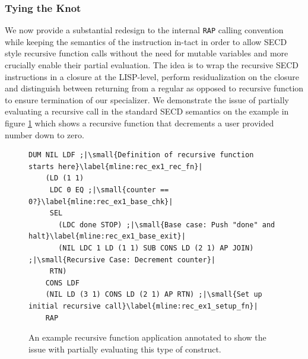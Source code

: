 \documentclass[a4paper,12pt,twoside,openright]{report}
\theoremstyle{definition}
\begin{document}


\subsubsection{Tying the Knot}\label{ssubsec:knot}
We now provide a substantial redesign to the internal \texttt{RAP} calling convention while keeping the semantics of the instruction in-tact in order to allow SECD style recursive function calls without the need for mutable variables and more crucially enable their partial evaluation. The idea is to wrap the recursive SECD instructions in a closure at the LISP-level, perform residualization on the closure and distinguish between returning from a regular as opposed to recursive function to ensure termination of our specializer. We demonstrate the issue of partially evaluating a recursive call in the standard SECD semantics on the example in figure \ref{lst:secd_recursion_ex1} which shows a recursive function that decrements a user provided number down to zero.

\begin{figure}[ht]
\begin{verbatim}
DUM NIL LDF ;|\small{Definition of recursive function starts here}\label{mline:rec_ex1_rec_fn}|
    (LD (1 1)
     LDC 0 EQ ;|\small{counter == 0?}\label{mline:rec_ex1_base_chk}|
     SEL
       (LDC done STOP) ;|\small{Base case: Push "done" and halt}\label{mline:rec_ex1_base_exit}|
       (NIL LDC 1 LD (1 1) SUB CONS LD (2 1) AP JOIN) ;|\small{Recursive Case: Decrement counter}|
     RTN)
    CONS LDF
    (NIL LD (3 1) CONS LD (2 1) AP RTN) ;|\small{Set up initial recursive call}\label{mline:rec_ex1_setup_fn}|
    RAP
\end{verbatim}
\caption{An example recursive function application annotated to show the issue with partially evaluating this type of construct.}
\label{lst:secd_recursion_ex1}
\end{figure}
\end{document}
